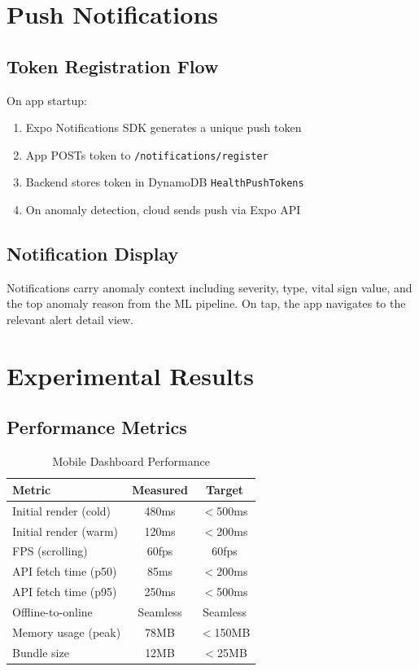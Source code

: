 \documentclass[conference]{IEEEtran}
\begin{document}
\section{Push Notifications}

\subsection{Token Registration Flow}
On app startup:
\begin{enumerate}
    \item Expo Notifications SDK generates a unique push token
    \item App POSTs token to \texttt{/notifications/register}
    \item Backend stores token in DynamoDB \texttt{HealthPushTokens}
    \item On anomaly detection, cloud sends push via Expo API
\end{enumerate}

\subsection{Notification Display}
Notifications carry anomaly context including severity, type, vital sign value, and the top anomaly reason from the ML pipeline. On tap, the app navigates to the relevant alert detail view.

\section{Experimental Results}

\subsection{Performance Metrics}

\begin{table}[H]
\centering
\caption{Mobile Dashboard Performance}
\label{tab:perf}
\begin{tabular}{lcc}
\toprule
\textbf{Metric} & \textbf{Measured} & \textbf{Target} \\
\midrule
Initial render (cold) & 480ms & $<$500ms \\
Initial render (warm) & 120ms & $<$200ms \\
FPS (scrolling) & 60fps & 60fps \\
API fetch time (p50) & 85ms & $<$200ms \\
API fetch time (p95) & 250ms & $<$500ms \\
Offline-to-online & Seamless & Seamless \\
Memory usage (peak) & 78MB & $<$150MB \\
Bundle size & 12MB & $<$25MB \\
\bottomrule
\end{tabular}
\end{table}
\end{document}
